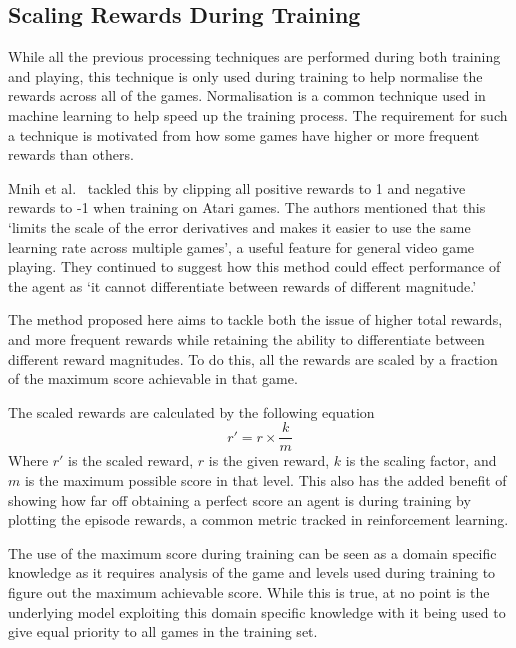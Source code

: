 \subsection{Scaling Rewards During Training}
While all the previous processing techniques are performed during both training and playing, this technique is only used during training to help normalise the rewards across all of the games.
Normalisation is a common technique used in machine learning to help speed up the training process.
The requirement for such a technique is motivated from how some games have higher or more frequent rewards than others.
\par
Mnih et al.~\cite{DeepAtari} tackled this by clipping all positive rewards to 1 and negative rewards to -1 when training on Atari games.
The authors mentioned that this `limits the scale of the error derivatives and makes it easier to use the same learning rate across multiple games', a useful feature for general video game playing.
They continued to suggest how this method could effect performance of the agent as `it cannot differentiate between rewards of different magnitude.'
\par
The method proposed here aims to tackle both the issue of higher total rewards, and more frequent rewards while retaining the ability to differentiate between different reward magnitudes.
To do this, all the rewards are scaled by a fraction of the maximum score achievable in that game.
\par
The scaled rewards are calculated by the following equation
\begin{equation} \label{eq:scalingReward}
    r\prime=r\times\frac{k}{m}
\end{equation}
Where $r\prime$ is the scaled reward, $r$ is the given reward, $k$ is the scaling factor, and $m$ is the maximum possible score in that level.
This also has the added benefit of showing how far off obtaining a perfect score an agent is during training by plotting the episode rewards, a common metric tracked in reinforcement learning.
\par
The use of the maximum score during training can be seen as a domain specific knowledge as it requires analysis of the game and levels used during training to figure out the maximum achievable score.
While this is true, at no point is the underlying model exploiting this domain specific knowledge with it being used to give equal priority to all games in the training set.

